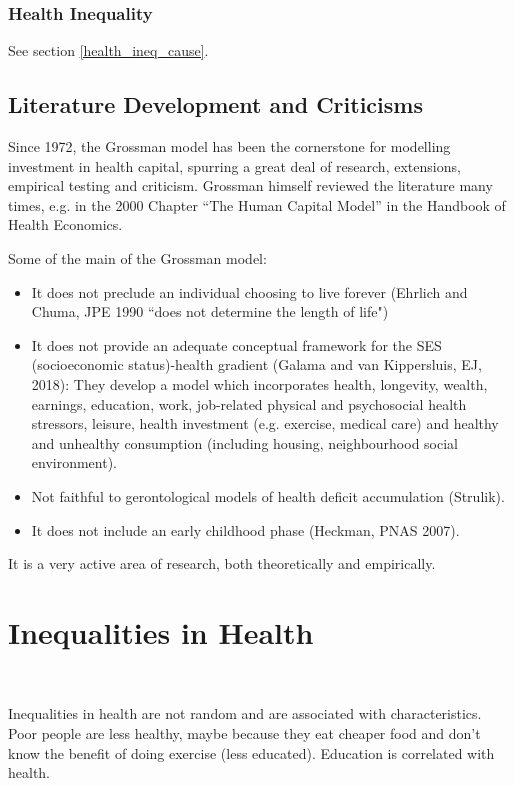         \subsubsection{Health Inequality}

            See section \ref{health_ineq_cause}.

    \subsection{Literature Development and Criticisms}
    
        Since 1972, the Grossman model has been the cornerstone for modelling investment in health capital, spurring a great deal of research, extensions, empirical testing and criticism. Grossman himself reviewed the literature many times, e.g. in the 2000 Chapter “The Human Capital Model” in the Handbook of Health Economics.
        
        Some of the main  of the Grossman model:
            \begin{itemize}
                \item It does not preclude an individual choosing to live forever (Ehrlich and Chuma, JPE 1990 “does not determine the length of life")
                \item It does not provide an adequate conceptual framework for the SES (socioeconomic status)-health gradient (Galama and van Kippersluis, EJ, 2018): They develop a model which incorporates health, longevity, wealth, earnings, education, work, job-related physical and psychosocial health stressors, leisure, health investment (e.g. exercise, medical care) and healthy and unhealthy consumption (including housing, neighbourhood social environment).
                \item Not faithful to gerontological models of health deficit accumulation (Strulik).
                \item It does not include an early childhood phase (Heckman, PNAS 2007).
            \end{itemize}
            
        It is a very active area of research, both theoretically and empirically.




\section{Inequalities in Health}\

    Inequalities in health are not random and are associated with characteristics. Poor people are less healthy, maybe because they eat cheaper food and don't know the benefit of doing exercise (less educated). Education is correlated with health.

